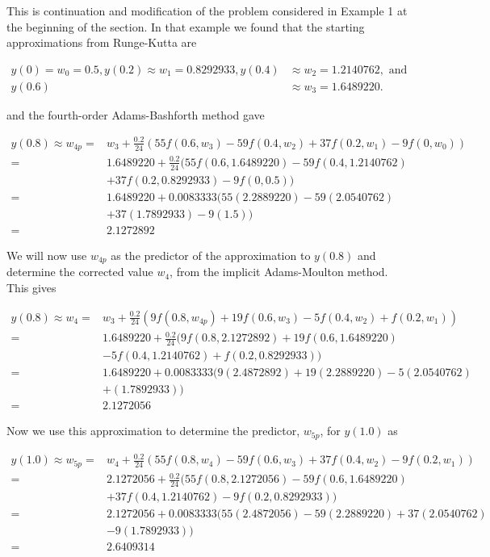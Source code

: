 \begin{mysolution}
This is continuation and modification of the problem considered in Example 1 at the beginning of the section. In that example we found that the starting approximations from Runge-Kutta are

$$
\begin{aligned}
y(0)=w_{0}=0.5, y(0.2) \approx w_{1}=0.8292933, y(0.4) & \approx w_{2}=1.2140762, \text { and } \\
y(0.6) & \approx w_{3}=1.6489220 .
\end{aligned}
$$

and the fourth-order Adams-Bashforth method gave

$$
\begin{aligned}
y(0.8) \approx w_{4 p}= & w_{3}+\frac{0.2}{24}\left(55 f\left(0.6, w_{3}\right)-59 f\left(0.4, w_{2}\right)+37 f\left(0.2, w_{1}\right)-9 f\left(0, w_{0}\right)\right) \\
= & 1.6489220+\frac{0.2}{24}(55 f(0.6,1.6489220)-59 f(0.4,1.2140762) \\
& +37 f(0.2,0.8292933)-9 f(0,0.5)) \\
= & 1.6489220+0.0083333(55(2.2889220)-59(2.0540762) \\
& +37(1.7892933)-9(1.5)) \\
= & 2.1272892
\end{aligned}
$$

We will now use $w_{4 p}$ as the predictor of the approximation to $y(0.8)$ and determine the corrected value $w_{4}$, from the implicit Adams-Moulton method. This gives

$$
\begin{aligned}
y(0.8) \approx w_{4}= & w_{3}+\frac{0.2}{24}\left(9 f\left(0.8, w_{4 p}\right)+19 f\left(0.6, w_{3}\right)-5 f\left(0.4, w_{2}\right)+f\left(0.2, w_{1}\right)\right) \\
= & 1.6489220+\frac{0.2}{24}(9 f(0.8,2.1272892)+19 f(0.6,1.6489220) \\
& -5 f(0.4,1.2140762)+f(0.2,0.8292933)) \\
= & 1.6489220+0.0083333(9(2.4872892)+19(2.2889220)-5(2.0540762) \\
& +(1.7892933)) \\
= & 2.1272056
\end{aligned}
$$

Now we use this approximation to determine the predictor, $w_{5 p}$, for $y(1.0)$ as

$$
\begin{aligned}
y(1.0) \approx w_{5 p}= & w_{4}+\frac{0.2}{24}\left(55 f\left(0.8, w_{4}\right)-59 f\left(0.6, w_{3}\right)+37 f\left(0.4, w_{2}\right)-9 f\left(0.2, w_{1}\right)\right) \\
= & 2.1272056+\frac{0.2}{24}(55 f(0.8,2.1272056)-59 f(0.6,1.6489220) \\
& +37 f(0.4,1.2140762)-9 f(0.2,0.8292933)) \\
= & 2.1272056+0.0083333(55(2.4872056)-59(2.2889220)+37(2.0540762) \\
& -9(1.7892933)) \\
= & 2.6409314
\end{aligned}
$$


\end{mysolution}
